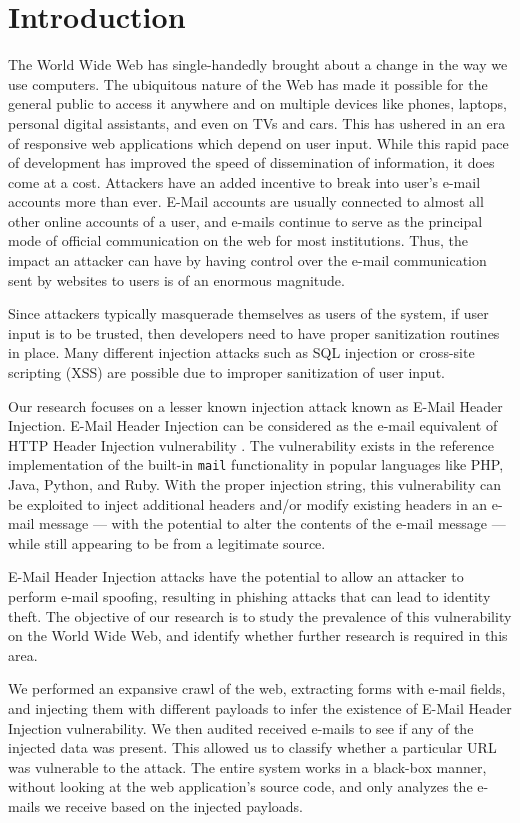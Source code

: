 \section{Introduction}
	The World Wide Web has single-handedly brought about a change in the way we use computers. The ubiquitous nature of the Web has made it possible for the general public to access it anywhere and on multiple devices like phones, laptops, personal digital assistants, and even on TVs and cars. This has ushered in an era of responsive web applications which depend on user input. While this rapid pace of development has improved the speed of dissemination of information, it does come at a cost. Attackers have an added incentive to break into user's e-mail accounts more than ever. E-Mail accounts are usually connected to almost all other online accounts of a user, and e-mails continue to serve as the principal mode of official communication on the web for most institutions. Thus, the impact an attacker can have by having control over the e-mail communication sent by websites to users is of an enormous magnitude. 
	
	Since attackers typically masquerade themselves as users of the system, if user input is to be trusted, then developers need to have proper sanitization routines in place. Many different injection attacks such as SQL injection or cross-site scripting (XSS) \cite{OWASPT10} are possible due to improper sanitization of user input. 
	
	Our research focuses on a lesser known injection attack known as E-Mail Header Injection. E-Mail Header Injection can be considered as the e-mail equivalent of HTTP Header Injection vulnerability \cite{wiki:HTTP_headerinjection}. The vulnerability exists in the reference implementation of the built-in \texttt{mail} functionality in popular languages like PHP, Java, Python, and Ruby. With the proper injection string, this vulnerability can be exploited to inject additional headers and/or modify existing headers in an e-mail message --- with the potential to alter the contents of the e-mail message --- while still appearing to be from a legitimate source.
	
	E-Mail Header Injection attacks have the potential to allow an attacker to perform e-mail spoofing, resulting in phishing attacks that can lead to identity theft.
	The objective of our research is to study the prevalence of this vulnerability on the World Wide Web, and identify whether further research is required in this area.
	
	We performed an expansive crawl of the web, extracting forms with e-mail fields, and injecting them with different payloads to infer the existence of E-Mail Header Injection vulnerability. We then audited received e-mails to see if any of the injected data was present. This allowed us to classify whether a particular URL was vulnerable to the attack. The entire system works in a black-box manner, without looking at the web application's source code, and only analyzes the e-mails we receive based on the injected payloads.

